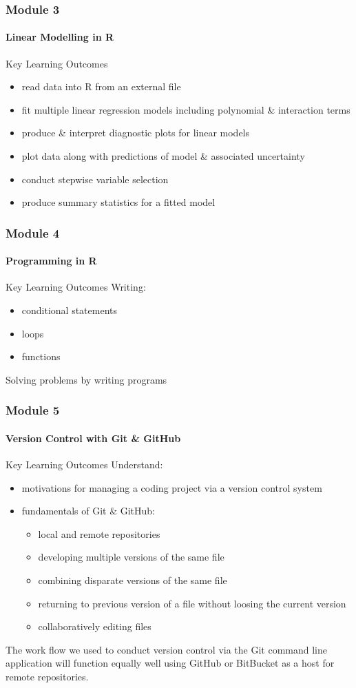 \documentclass[xcolor=dvipsnames]{beamer}
\begin{document}
\begin{frame}
\frametitle{Module 3}
\framesubtitle{Linear Modelling in R}
\begin{block}{Key Learning Outcomes}
\begin{itemize}
\item read data into R from an external file
\item fit multiple linear regression models including polynomial \& interaction terms
\item produce \& interpret diagnostic plots for linear models
\item plot data along with predictions of model \& associated uncertainty
\item conduct stepwise variable selection
\item produce summary statistics for a fitted model
\end{itemize}
\end{block}
\end{frame}

\begin{frame}
\frametitle{Module 4}
\framesubtitle{Programming in R}
\begin{block}{Key Learning Outcomes}
Writing:
\begin{itemize}
\item conditional statements
\item loops
\item functions
\newline
\end{itemize}
Solving problems by writing programs
\end{block}
\end{frame}

\begin{frame}
\frametitle{Module 5}
\framesubtitle{Version Control with Git \& GitHub}
\begin{block}{Key Learning Outcomes}
Understand:
\begin{itemize}
\item motivations for managing a coding project via a version control system
\item fundamentals of Git \& GitHub: \begin{itemize}
  \item local and remote repositories
  \item developing multiple versions of the same file
  \item combining disparate versions of the same file
  \item returning to previous version of a file without loosing the current version
  \item collaboratively editing files
  \end{itemize}
\end{itemize}
\end{block}
The work flow we used to conduct version control via the Git command line application will function equally well using GitHub or BitBucket as a host for remote repositories.
\end{frame}
\end{document}
